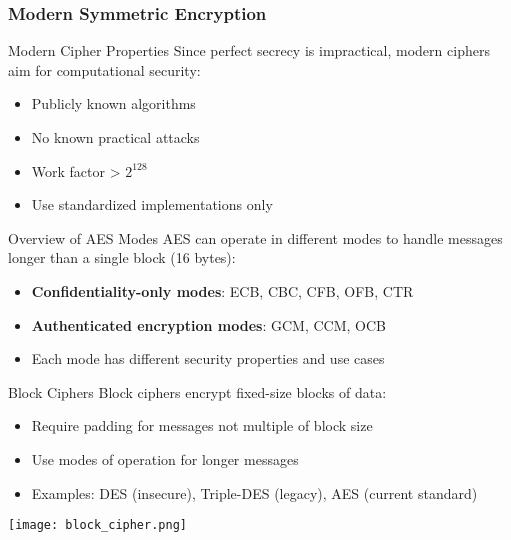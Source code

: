\multend

\subsubsection{Modern Symmetric Encryption}


\begin{concept}{Modern Cipher Properties}
    Since perfect secrecy is impractical, modern ciphers aim for computational security:
    \begin{itemize}
        \item Publicly known algorithms
        \item No known practical attacks
        \item Work factor > $2^{128}$
        \item Use standardized implementations only
    \end{itemize}
\end{concept}

\begin{theorem}{Overview of AES Modes}
AES can operate in different modes to handle messages longer than a single block (16 bytes):
\begin{itemize}
    \item \textbf{Confidentiality-only modes}: ECB, CBC, CFB, OFB, CTR
    \item \textbf{Authenticated encryption modes}: GCM, CCM, OCB
    \item Each mode has different security properties and use cases
\end{itemize}
\end{theorem}

\begin{concept}{Block Ciphers}
    Block ciphers encrypt fixed-size blocks of data:
    \begin{itemize}
        \item Require padding for messages not multiple of block size
        \item Use modes of operation for longer messages
        \item Examples: DES (insecure), Triple-DES (legacy), AES (current standard)
    \end{itemize}
    \texttt{[image: block\_cipher.png]}
\end{concept}

\multend


\small

